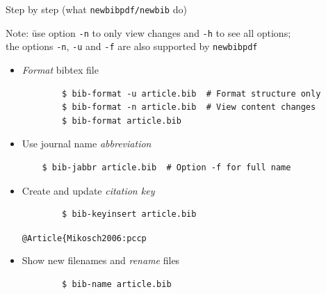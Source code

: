 \documentclass[xcolor={table,dvipsnames}]{beamer}
\renewcommand{\emph}[1]{\textit{\color{orange!90!brown}#1}}
\newcommand{\faint}{\color{black!10!gray}}
\begin{document}
\begin{frame}[fragile]{Step by step (what \texttt{newbibpdf/newbib} do)}
  \begin{tabbing}
    Note: \=use option {\faint\verb!-n!} to only view changes
                   and {\faint\verb!-h!} to see all options; \\
	  \>the options {\faint\verb!-n!}, {\faint\verb!-u!} and
	  {\faint\verb!-f!} are also supported by \texttt{newbibpdf}
  \end{tabbing}

  \begin{itemize}

    \item \emph{Format} bibtex file
      \begin{lstlisting}
        $ bib-format -u article.bib  # Format structure only
        $ bib-format -n article.bib  # View content changes
        $ bib-format article.bib
      \end{lstlisting}

    \item Use journal name \emph{abbreviation}
      \begin{lstlisting}
	$ bib-jabbr article.bib  # Option -f for full name
      \end{lstlisting}

    \item Create and update \emph{citation key}
      \begin{lstlisting}
        $ bib-keyinsert article.bib
      \end{lstlisting}
      \vspace{-0.5\baselineskip}
      \hfill{\faint\verb!@Article{Mikosch2006:pccp!}

    \item Show new filenames and \emph{rename} files
      \begin{lstlisting}
        $ bib-name article.bib
      \end{lstlisting}

  \end{itemize}
\end{frame}
\end{document}

